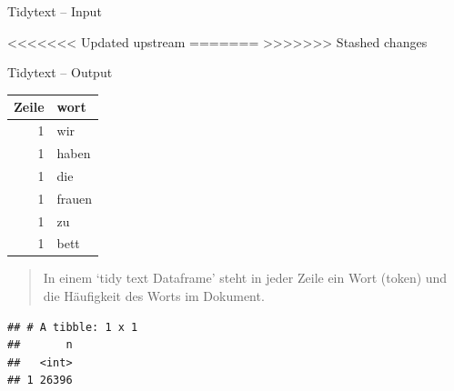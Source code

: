 \begin{frame}[fragile]{Tidytext -- Input}

\begin{Shaded}
\begin{Highlighting}[]
\StringTok{ }\NormalTok{(}\NormalTok{, }\NormalTok{, }
    \NormalTok{, }\NormalTok{)}
<<<<<<< Updated upstream
\StringTok{ }\NormalTok{(} \OperatorTok{:}\NormalTok{, }
=======
\StringTok{ }\NormalTok{(} \NormalTok{:}\NormalTok{, } 
>>>>>>> Stashed changes
\end{Highlighting}
\end{Shaded}

\end{frame}

\begin{frame}[fragile]{Tidytext -- Output}

\begin{longtable}[]{@{}rl@{}}
\toprule
Zeile & wort\tabularnewline
\midrule
\endhead
1 & wir\tabularnewline
1 & haben\tabularnewline
1 & die\tabularnewline
1 & frauen\tabularnewline
1 & zu\tabularnewline
1 & bett\tabularnewline
\bottomrule
\end{longtable}

\begin{quote}
In einem `tidy text Dataframe' steht in jeder Zeile ein Wort (token) und
die Häufigkeit des Worts im Dokument.
\end{quote}

\begin{verbatim}
## # A tibble: 1 x 1
##       n
##   <int>
## 1 26396
\end{verbatim}

\end{frame}

